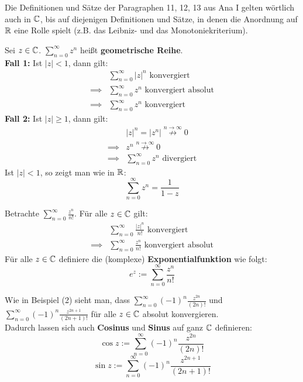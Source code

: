 \documentclass[a4paper,twoside,DIV15,BCOR12mm,chapterprefix=true,headings=twolinechapter]{scrbook}
\begin{document}
Die Definitionen und Sätze der Paragraphen 11, 12, 13 aus Ana I gelten wörtlich
auch in $\mathbb{C}$, bis auf diejenigen Definitionen und Sätze, in denen die Anordnung
auf $\mathbb{R}$ eine Rolle spielt (z.B. das Leibniz- und das Monotoniekriterium).
\\
\begin{beispiele}
\item Sei $z\in\mathbb{C}$. $\sum_{n=0}^{\infty} z^n$ heißt \textbf{geometrische Reihe}.\\
\textbf{Fall 1:} Ist $|z|< 1$, dann gilt:
\begin{align*}
&\sum_{n=0}^{\infty} |z|^n \text{ konvergiert}\\
\implies &\sum_{n=0}^{\infty} z^n\text{ konvergiert absolut}\\
\implies &\sum_{n=0}^{\infty} z^n\text{ konvergiert}
\end{align*}
\textbf{Fall 2:} Ist $|z|\ge 1$, dann gilt:
\begin{align*}
&|z|^n=|z^n|\stackrel{n\to\infty}{\not\to} 0\\
\implies &z^n\stackrel{n\to\infty}{\not\to} 0\\
\implies &\sum_{n=0}^{\infty} z^n \text{ divergiert}
\end{align*}
Ist $|z|<1$, so zeigt man wie in $\mathbb{R}$:
\[\sum_{n=0}^{\infty} z^n= \frac1{1-z}\]
\item Betrachte $\sum_{n=0}^\infty \frac{z^n}{n!}$. Für alle $z\in\mathbb{C}$ gilt:
\begin{align*}
&\sum_{n=0}^\infty \frac{|z|^n}{n!} \text{ konvergiert}\\
\implies &\sum_{n=0}^\infty \frac{z^n}{n!} \text{ konvergiert absolut}
\end{align*}
Für alle $z\in\mathbb{C}$ definiere die (komplexe) \textbf{Exponentialfunktion} wie folgt:
\[e^z:=\sum_{n=0}^\infty\frac{z^n}{n!}\]
\item Wie in Beispiel (2) sieht man, dass $\sum_{n=0}^\infty (-1)^n \frac{z^{2n}}{(2n)!}$ und
$\sum_{n=0}^\infty (-1)^n \frac{z^{2n+1}}{(2n+1)!}$ für alle $z\in\mathbb{C}$ absolut konvergieren.\\
Dadurch lassen sich auch \textbf{Cosinus} und \textbf{Sinus} auf ganz $\mathbb{C}$ definieren:
\[\cos{z}:=\sum_{n=0}^\infty (-1)^n\frac{z^{2n}}{(2n)!}\]
\[\sin{z}:=\sum_{n=0}^\infty (-1)^n\frac{z^{2n+1}}{(2n+1)!}\]
\end{beispiele}
\end{document}
